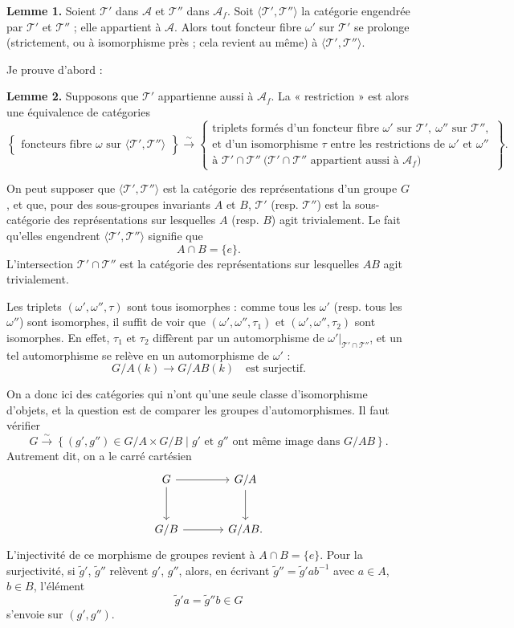 \documentclass[11pt]{article}
\newcommand{\T}{\mathcal T}
\newcommand{\A}{\mathcal A}
\newcommand{\Af}{\mathcal A_f}
\begin{document}
\textbf{Lemme 1.} Soient \(\T'\) dans \(\A\) et \(\T''\) dans \(\Af\). Soit \(\langle\T',\T''\rangle\) la catégorie engendrée par \(\T'\) et \(\T''\) ; elle appartient à \(\A\). Alors tout foncteur fibre \(\omega'\) sur \(\T'\) se prolonge (strictement, ou à isomorphisme près ; cela revient au même) à \(\langle\T',\T''\rangle\).

Je prouve d'abord :

\textbf{Lemme 2.} Supposons que \(\T'\) appartienne aussi à \(\Af\). La « restriction » est alors une équivalence de catégories
\[
\left\{
\begin{array}{c}
\text{foncteurs fibre }\omega\text{ sur }\langle\T',\T''\rangle
\end{array}
\right\}
\xrightarrow{\sim}
\left\{
\begin{array}{c}
\text{triplets formés d'un foncteur fibre }\omega'\text{ sur }\T',\ \omega''\text{ sur }\T'',\\
\text{et d'un isomorphisme }\tau\text{ entre les restrictions de }\omega'\text{ et }\omega''\\
\text{à }\T'\cap\T''\ \bigl(\T'\cap\T''\text{ appartient aussi à }\Af\bigr)
\end{array}
\right\}.
\]

On peut supposer que \(\langle\T',\T''\rangle\) est la catégorie des représentations d'un groupe \(G\), et que, pour des sous-groupes invariants \(A\) et \(B\), \(\T'\) (resp. \(\T''\)) est la sous-catégorie des représentations sur lesquelles \(A\) (resp. \(B\)) agit trivialement. Le fait qu'elles engendrent \(\langle\T',\T''\rangle\) signifie que
\[
A\cap B=\{e\}.
\]
L'intersection \(\T'\cap\T''\) est la catégorie des représentations sur lesquelles \(AB\) agit trivialement.

Les triplets \((\omega',\omega'',\tau)\) sont tous isomorphes : comme tous les \(\omega'\) (resp. tous les \(\omega''\)) sont isomorphes, il suffit de voir que \((\omega',\omega'',\tau_1)\) et \((\omega',\omega'',\tau_2)\) sont isomorphes. En effet, \(\tau_1\) et \(\tau_2\) diffèrent par un automorphisme de \(\omega'|_{\T'\cap\T''}\), et un tel automorphisme se relève en un automorphisme de \(\omega'\) :
\[
G/A(k)\longrightarrow G/AB(k)\quad\text{est surjectif.}
\]

On a donc ici des catégories qui n'ont qu'une seule classe d'isomorphisme d'objets, et la question est de comparer les groupes d'automorphismes. Il faut vérifier
\[
G\xrightarrow{\sim}\left\{(g',g'')\in G/A\times G/B\mid g'\text{ et }g''\text{ ont même image dans }G/AB\right\}.
\]
Autrement dit, on a le carré cartésien
\[
\begin{tikzcd}[column sep=large,row sep=large]
G \arrow[r] \arrow[d] & G/A \arrow[d] \\
G/B \arrow[r] & G/AB .
\end{tikzcd}
\]
L'injectivité de ce morphisme de groupes revient à \(A\cap B=\{e\}\). Pour la surjectivité, si \(\widetilde g'\), \(\widetilde g''\) relèvent \(g'\), \(g''\), alors, en écrivant \(\widetilde g''=\widetilde g'ab^{-1}\) avec \(a\in A\), \(b\in B\), l'élément
\[
\widetilde g'a=\widetilde g''b\in G
\]
s'envoie sur \((g',g'')\).
\end{document}
